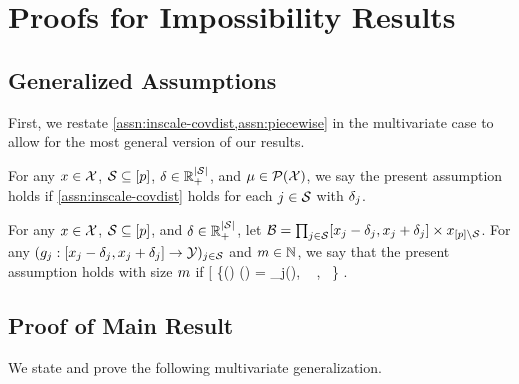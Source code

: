 %

\section{Proofs for Impossibility Results}\label{sec:impossibility-proofs}

\subsection{Generalized Assumptions}

First, we restate \cref{assn:inscale-covdist,assn:piecewise} in the multivariate case to allow for the most general version of our results.

\begin{appassumption}\label{assn:inscale-covdist-multivariate}
For any $x\in\mathcal{X}$, $\mathcal{S}\subseteq[p]$, $\inscale\in\PosReals^{\abs{\featuresub}}$, and $\mu\in\mathcal{P}(\mathcal{X})$, we say the present assumption holds if \cref{assn:inscale-covdist} holds for each $j\in\mathcal{S}$ with $\delta_{j}$.
\end{appassumption}

\begin{appassumption}\label{assn:piecewise-multivariate}
For any $x\in\mathcal{X}$, $\mathcal{S}\subseteq[p]$, and $\inscale\in\PosReals^{\abs{\featuresub}}$,
let $\mathcal{B} = \prod_{j\in\mathcal{S}} [x_{j}-\delta_{j}, x_{j}+\delta_{j}] \times x_{[p]\setminus\mathcal{S}}$.
%
For any $(g_{j}:[x_{j}-\delta_{j}, x_{j}+\delta_{j}]\to\mathcal{Y})_{j\in\mathcal{S}}$ and $m\in\mathbb{N}$, we say that the present assumption holds with size $m$ if
\*[
    \Big\{\model\in(\covspace\to\dataspace) \setdelim
    \forall\covvaldum\in\covnbhd \quad \model(\covvaldum) = \sum_{j\in\featuresub}\modeldum{}(\covvaldum{}), \ \model\restrict{\comp{\covnbhd}} \in \pwiselin{\numpiece}\restrict{\comp{\covnbhd}}, 
    \ \model {}\Big\} \subseteq \modelspace.
\]
\end{appassumption}

\subsection{Proof of Main Result}

We state and prove the following multivariate generalization.

